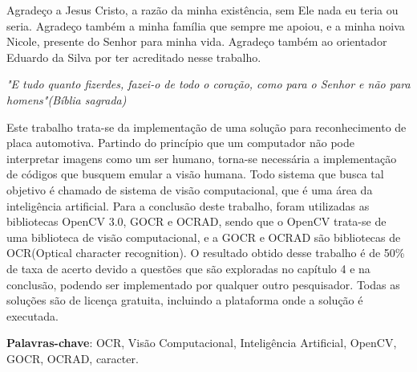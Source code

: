 \documentclass[12pt, oneside, a4paper, brazil]{abntex2}
\begin{document}
\begin{agradecimentos}
Agradeço a Jesus Cristo, a razão da minha existência, sem Ele nada eu teria ou seria. Agradeço também a minha família que sempre me apoiou, e a minha noiva Nicole, presente do Senhor para minha vida. Agradeço também ao orientador Eduardo da Silva por ter acreditado nesse trabalho.
\end{agradecimentos}

\begin{epigrafe}
    \vspace*{\fill}
	\begin{flushright}
		\textit{"E tudo quanto fizerdes, fazei-o de todo o coração, como para o Senhor e não para homens"(Bíblia sagrada)}
	\end{flushright}
\end{epigrafe}

\setlength{\absparsep}{18pt} %
\begin{resumo}
Este trabalho trata-se da implementação de uma solução para reconhecimento de placa automotiva. Partindo do princípio que um computador não pode interpretar imagens como um ser humano, torna-se necessária a implementação de códigos que busquem emular a visão humana. Todo sistema que busca tal objetivo é chamado de sistema de visão computacional, que é uma área da inteligência artificial. Para a conclusão deste trabalho, foram utilizadas as bibliotecas OpenCV 3.0, GOCR e OCRAD, sendo que o OpenCV trata-se de uma biblioteca de visão computacional, e a GOCR e OCRAD são bibliotecas de OCR(Optical character recognition). O resultado obtido desse trabalho é de 50\% de taxa de acerto devido a questões que são exploradas no capítulo 4 e na conclusão, podendo ser implementado por qualquer outro pesquisador. Todas as soluções são de licença gratuita, incluindo a plataforma onde a solução é executada. 

 \textbf{Palavras-chave}: OCR, Visão Computacional, Inteligência Artificial, OpenCV, GOCR, OCRAD, caracter.
\end{resumo}
\end{document}
